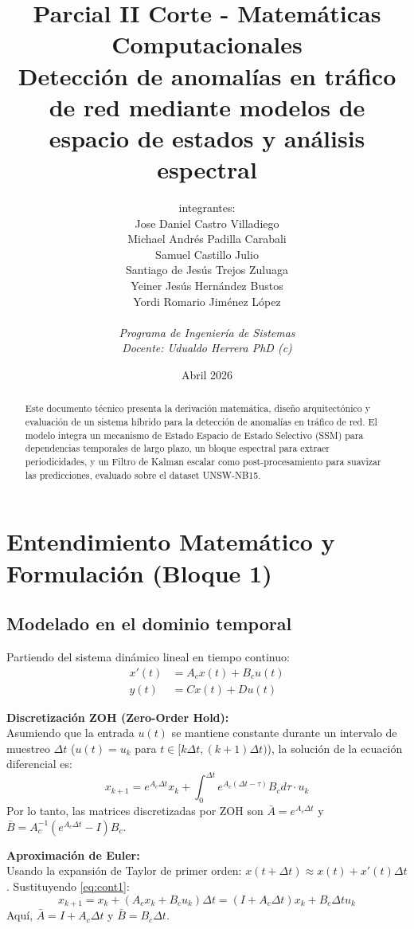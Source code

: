 \documentclass[12pt,a4paper]{article}
\title{\textbf{Parcial II Corte - Matemáticas Computacionales} \\ Detección de anomalías en tráfico de red mediante modelos de espacio de estados y análisis espectral}
\author{ integrantes:\\ 
    Jose Daniel Castro Villadiego \\ 
    Michael Andrés Padilla Carabali \\ 
    Samuel Castillo Julio \\ 
    Santiago de Jesús Trejos Zuluaga \\ 
    Yeiner Jesús Hernández Bustos \\ 
    Yordi Romario Jiménez López \\~\\
    \textit{Programa de Ingeniería de Sistemas} \\ 
    \textit{Docente: Udualdo Herrera PhD (c)}
}
\date{Abril 2026}
\begin{document}
\maketitle

\begin{abstract}
Este documento técnico presenta la derivación matemática, diseño arquitectónico y evaluación de un sistema híbrido para la detección de anomalías en tráfico de red. El modelo integra un mecanismo de Estado Espacio de Estado Selectivo (SSM) para dependencias temporales de largo plazo, un bloque espectral para extraer periodicidades, y un Filtro de Kalman escalar como post-procesamiento para suavizar las predicciones, evaluado sobre el dataset UNSW-NB15.
\end{abstract}

\tableofcontents
\newpage

\section{Entendimiento Matemático y Formulación (Bloque 1)}

\subsection{Modelado en el dominio temporal}

Partiendo del sistema dinámico lineal en tiempo continuo:
\begin{align}
x'(t) &= A_c x(t) + B_c u(t) \label{eq:cont1} \\
y(t) &= C x(t) + D u(t) \label{eq:cont2}
\end{align}

\textbf{Discretización ZOH (Zero-Order Hold):}\\
Asumiendo que la entrada $u(t)$ se mantiene constante durante un intervalo de muestreo $\Delta t$ ($u(t) = u_k$ para $t \in [k\Delta t, (k+1)\Delta t)$), la solución de la ecuación diferencial es:
\begin{equation}
x_{k+1} = e^{A_c \Delta t} x_k + \int_{0}^{\Delta t} e^{A_c (\Delta t - \tau)} B_c d\tau \cdot u_k
\end{equation}
Por lo tanto, las matrices discretizadas por ZOH son $\bar{A} = e^{A_c \Delta t}$ y $\bar{B} = A_c^{-1}(e^{A_c \Delta t} - I)B_c$.

\textbf{Aproximación de Euler:}\\
Usando la expansión de Taylor de primer orden: $x(t+\Delta t) \approx x(t) + x'(t)\Delta t$. Sustituyendo \eqref{eq:cont1}:
\begin{equation}
x_{k+1} = x_k + (A_c x_k + B_c u_k)\Delta t = (I + A_c \Delta t)x_k + B_c \Delta t u_k
\end{equation}
Aquí, $\bar{A} = I + A_c \Delta t$ y $\bar{B} = B_c \Delta t$.
\end{document}
